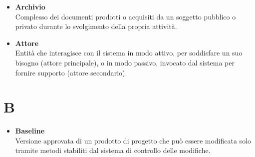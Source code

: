 \documentclass[a4paper,12pt]{article}
\begin{document}
{\begin{itemize}
                    Formato universale per la distribuzione di software su sistemi Linux. Consente di eseguire un'applicazione tramite un singolo file, senza necessità di installazione.
                \item \textbf{Archivio}\\
                    Complesso dei documenti prodotti o acquisiti da un soggetto pubblico o privato durante lo svolgimento della propria attività.
                \item \textbf{Attore}\\
                    Entità che interagisce con il sistema in modo attivo, per soddisfare un suo bisogno (attore principale), o in modo passivo, invocato dal sistema per fornire supporto (attore secondario).
            \end{itemize}
        }
        \newpage

        \section*{B} {
            \begin{itemize}
                \item \textbf{Baseline}\\
                    Versione approvata di un prodotto di progetto che può essere modificata solo tramite metodi stabiliti dal sistema di controllo delle modifiche.
            \end{itemize}
        }
        \newpage
\end{document}
